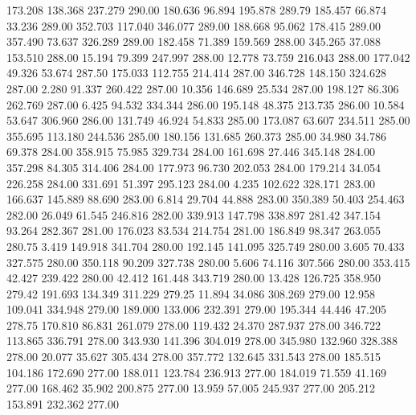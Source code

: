  173.208  138.368  237.279       290.00
 180.636   96.894  195.878       289.79
 185.457   66.874   33.236       289.00
 352.703  117.040  346.077       289.00
 188.668   95.062  178.415       289.00
 357.490   73.637  326.289       289.00
 182.458   71.389  159.569       288.00
 345.265   37.088  153.510       288.00
  15.194   79.399  247.997       288.00
  12.778   73.759  216.043       288.00
 177.042   49.326   53.674       287.50
 175.033  112.755  214.414       287.00
 346.728  148.150  324.628       287.00
   2.280   91.337  260.422       287.00
  10.356  146.689   25.534       287.00
 198.127   86.306  262.769       287.00
   6.425   94.532  334.344       286.00
 195.148   48.375  213.735       286.00
  10.584   53.647  306.960       286.00
 131.749   46.924   54.833       285.00
 173.087   63.607  234.511       285.00
 355.695  113.180  244.536       285.00
 180.156  131.685  260.373       285.00
  34.980   34.786   69.378       284.00
 358.915   75.985  329.734       284.00
 161.698   27.446  345.148       284.00
 357.298   84.305  314.406       284.00
 177.973   96.730  202.053       284.00
 179.214   34.054  226.258       284.00
 331.691   51.397  295.123       284.00
   4.235  102.622  328.171       283.00
 166.637  145.889   88.690       283.00
   6.814   29.704   44.888       283.00
 350.389   50.403  254.463       282.00
  26.049   61.545  246.816       282.00
 339.913  147.798  338.897       281.42
 347.154   93.264  282.367       281.00
 176.023   83.534  214.754       281.00
 186.849   98.347  263.055       280.75
   3.419  149.918  341.704       280.00
 192.145  141.095  325.749       280.00
   3.605   70.433  327.575       280.00
 350.118   90.209  327.738       280.00
   5.606   74.116  307.566       280.00
 353.415   42.427  239.422       280.00
  42.412  161.448  343.719       280.00
  13.428  126.725  358.950       279.42
 191.693  134.349  311.229       279.25
  11.894   34.086  308.269       279.00
  12.958  109.041  334.948       279.00
 189.000  133.006  232.391       279.00
 195.344   44.446   47.205       278.75
 170.810   86.831  261.079       278.00
 119.432   24.370  287.937       278.00
 346.722  113.865  336.791       278.00
 343.930  141.396  304.019       278.00
 345.980  132.960  328.388       278.00
  20.077   35.627  305.434       278.00
 357.772  132.645  331.543       278.00
 185.515  104.186  172.690       277.00
 188.011  123.784  236.913       277.00
 184.019   71.559   41.169       277.00
 168.462   35.902  200.875       277.00
  13.959   57.005  245.937       277.00
 205.212  153.891  232.362       277.00
